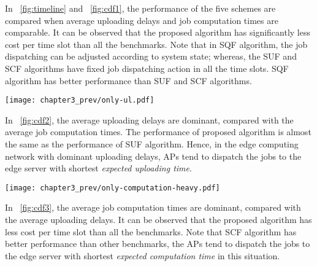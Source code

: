 In \figurename~\ref{fig:timeline} and \figurename~\ref{fig:cdf1}, the performance of the five schemes are compared when average uploading delays and job computation times are comparable. It can be observed that the proposed algorithm has significantly less cost per time slot than all the benchmarks. Note that in SQF algorithm, the job dispatching can be adjusted according to system state; whereas, the SUF and SCF algorithms have fixed job dispatching action in all the time slots. SQF algorithm has better performance than SUF and SCF algorithms.

\begin{figure*}
    \centering
    \texttt{[image: chapter3\_prev/only-ul.pdf]}
    \caption{Cumulative distribution function (CDF) of the cost per time slot when average uploading delays are dominant. For example, the average uploading delay of the first job type from first AP to first edge server is $10$ time slots, and the average job computation time of the first job type at the first edge server is $1$ time slot.}
    \label{fig:cdf2}
\end{figure*}

In \figurename~\ref{fig:cdf2}, the average uploading delays are dominant, compared with the average job computation times. The performance of proposed algorithm is almost the same as the performance of SUF algorithm. Hence, in the edge computing network with dominant uploading delays, APs tend to dispatch the jobs to the edge server with shortest \emph{expected uploading time}.

\begin{figure*}
    \centering
    \texttt{[image: chapter3\_prev/only-computation-heavy.pdf]}
    \caption{Cumulative distribution function (CDF) of the cost per time slot when average job computation times are dominant. For example, the average uploading delay of the first job type from first AP to first edge server is $1$ time slots, and the average job computation time of the first job type at the first edge server ranges from $10$ to $15$ time slots.}
    \label{fig:cdf3}
\end{figure*}

In \figurename~\ref{fig:cdf3}, the average job computation times are dominant, compared with the average uploading delays. It can be observed that the proposed algorithm has less cost per time slot than all the benchmarks. Note that SCF algorithm has better performance than other benchmarks, the APs tend to dispatch the jobs to the edge server with shortest \emph{expected computation time} in this situation.

